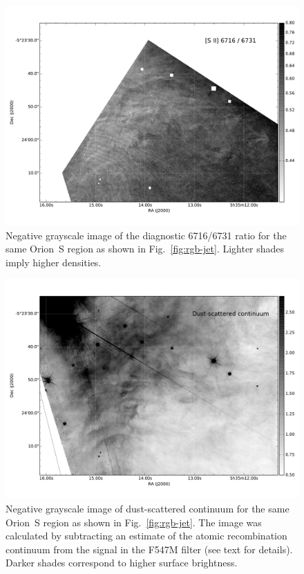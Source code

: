 \documentclass[preprint]{aastex}
\begin{document}
\begin{figure}
  \centering
  \includegraphics[width=\linewidth]{jet_region_siiratio}
  \caption{Negative grayscale image of the diagnostic \sii{} 6716/6731
    ratio for the same Orion~S region as shown in
    Fig.~\ref{fig:rgb-jet}.  Lighter shades imply higher
    densities.}
  \label{fig:sii-jet}
\end{figure}

\begin{figure}
  \centering
  \includegraphics[width=\linewidth]{jet_region_scattered}
  \caption{Negative grayscale image of dust-scattered continuum for
    the same Orion~S region as shown in Fig.~\ref{fig:rgb-jet}.  The
    image was calculated by subtracting an estimate of the atomic
    recombination continuum from the signal in the F547M filter (see
    text for details).  Darker shades correspond to higher surface
    brightness.}
  \label{fig:scatter-jet}
\end{figure}
\end{document}
